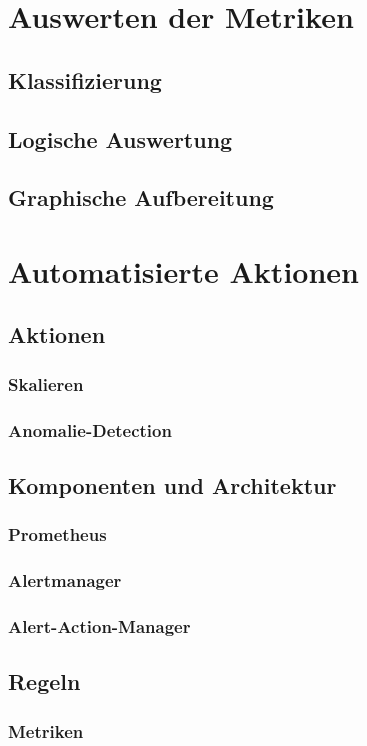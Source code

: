 \documentclass[a4paper,12pt]{scrartcl}
\begin{document}
\section{Auswerten der Metriken}
\subsection{Klassifizierung}
\subsection{Logische Auswertung}
\subsection{Graphische Aufbereitung}

\section{Automatisierte Aktionen}
\subsection{Aktionen}
\subsubsection{Skalieren}
\subsubsection{Anomalie-Detection}
\subsection{Komponenten und Architektur}
\subsubsection{Prometheus}
\subsubsection{Alertmanager}
\subsubsection{Alert-Action-Manager}
\subsection{Regeln}
\subsubsection{Metriken}
\end{document}
